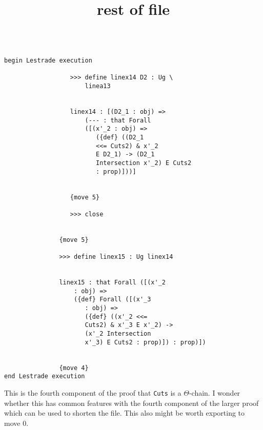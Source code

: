 \documentclass[12pt]{article}
\title {rest of file}
\begin{document}
\begin{verbatim}

begin Lestrade execution

                  >>> define linex14 D2 : Ug \
                      linea13


                  linex14 : [(D2_1 : obj) => 
                      (--- : that Forall 
                      ([(x'_2 : obj) => 
                         ({def} ((D2_1 
                         <<= Cuts2) & x'_2 
                         E D2_1) -> (D2_1 
                         Intersection x'_2) E Cuts2 
                         : prop)]))]


                  {move 5}

                  >>> close


               {move 5}

               >>> define linex15 : Ug linex14


               linex15 : that Forall ([(x'_2 
                   : obj) => 
                   ({def} Forall ([(x'_3 
                      : obj) => 
                      ({def} ((x'_2 <<= 
                      Cuts2) & x'_3 E x'_2) -> 
                      (x'_2 Intersection 
                      x'_3) E Cuts2 : prop)]) : prop)])


               {move 4}
end Lestrade execution
\end{verbatim}

This is the fourth component of the proof that {\tt Cuts} is a $\Theta$-chain.  I wonder whether this has common features with the fourth component of the larger proof
which can be used to shorten the file.  This also might be worth exporting to move 0.
\end{document}
